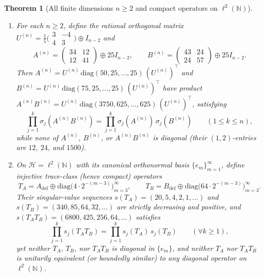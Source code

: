 \documentclass[11pt,a4paper]{article}
\newtheorem{theorem}{Theorem}[section]
\theoremstyle{definition}
\newcommand{\N}{\mathbb{N}}
\newcommand{\diag}{\mathrm{diag}}
\begin{document}
\begin{theorem}[All finite dimensions $n \ge 2$ and compact operators on $\ell^2(\N)$]\label{thm:all-dim}
\leavevmode
\begin{enumerate}
  \item[(a)] For each $n \ge 2$, define the rational orthogonal matrix $U^{(n)} = \frac{1}{5}\bigl(\begin{smallmatrix} 3 & -4 \\ 4 & 3 \end{smallmatrix}\bigr) \oplus I_{n-2}$ and
  \[
    A^{(n)} = \begin{pmatrix} 34 & 12 \\ 12 & 41 \end{pmatrix} \oplus 25 I_{n-2},
    \qquad
    B^{(n)} = \begin{pmatrix} 43 & 24 \\ 24 & 57 \end{pmatrix} \oplus 25 I_{n-2}.
  \]
  Then $A^{(n)} = U^{(n)}\,\diag(50, 25, \dots, 25)\,(U^{(n)})^\top$ and $B^{(n)} = U^{(n)}\,\diag(75, 25, \dots, 25)\,(U^{(n)})^\top$ have product $A^{(n)} B^{(n)} = U^{(n)}\,\diag(3750, 625, \dots, 625)\,(U^{(n)})^\top$, satisfying
  \[
    \prod_{j=1}^k \sigma_j(A^{(n)}B^{(n)}) = \prod_{j=1}^k \sigma_j(A^{(n)})\,\sigma_j(B^{(n)})
    \qquad (1 \le k \le n),
  \]
  while none of $A^{(n)}$, $B^{(n)}$, or $A^{(n)}B^{(n)}$ is diagonal (their $(1,2)$-entries are $12$, $24$, and $1500$).
  \item[(b)] On $\mathcal{H} = \ell^2(\N)$ with its canonical orthonormal basis $\{e_m\}_{m=1}^\infty$, define injective trace-class (hence compact) operators
  \[
    T_A = A_{\mathrm{def}} \oplus \diag\bigl(4\cdot 2^{-(m-3)}\bigr)_{m=3}^\infty,
    \qquad
    T_B = B_{\mathrm{def}} \oplus \diag\bigl(64\cdot 2^{-(m-3)}\bigr)_{m=3}^\infty.
  \]
  Their singular-value sequences $s(T_A) = (20, 5, 4, 2, 1, \dots)$ and $s(T_B) = (340, 85, 64, 32, \dots)$ are strictly decreasing and positive, and $s(T_A T_B) = (6800, 425, 256, 64, \dots)$ satisfies
  \[
    \prod_{j=1}^k s_j(T_A T_B) = \prod_{j=1}^k s_j(T_A)\,s_j(T_B)
    \qquad (\forall k \ge 1),
  \]
  yet neither $T_A$, $T_B$, nor $T_A T_B$ is diagonal in $\{e_m\}$, and neither $T_A$ nor $T_A T_B$ is unitarily equivalent (or boundedly similar) to any diagonal operator on $\ell^2(\N)$.
\end{enumerate}
\end{theorem}
\end{document}
